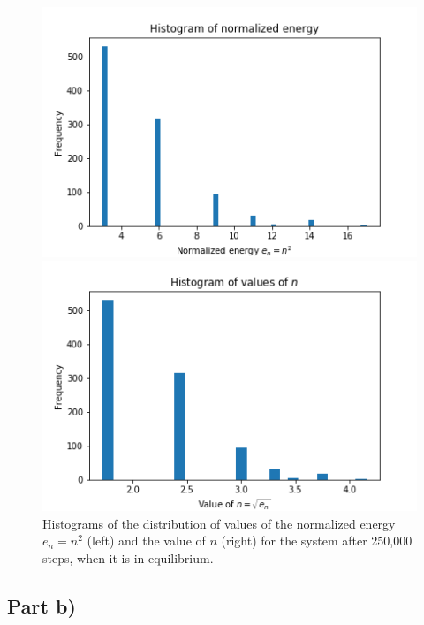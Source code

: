 \documentclass{article}
\begin{document}
\begin{figure}[H]
	\centering
	\begin{minipage}{0.49\linewidth}
		\includegraphics[width=\linewidth]{../images/q1a_energy_hist.png}
	\end{minipage}
		\begin{minipage}{0.49\linewidth}
		\includegraphics[width=\linewidth]{../images/q1a_n_hist.png}
	\end{minipage}
	\caption{Histograms of the distribution of values of the normalized energy $e_n = n^2$ (left) and the value of $n$ (right) for the system after 250,000 steps, when it is in equilibrium.}
	\label{fig:q1a_hist}
\end{figure}

\subsection{Part b)}
\end{document}
